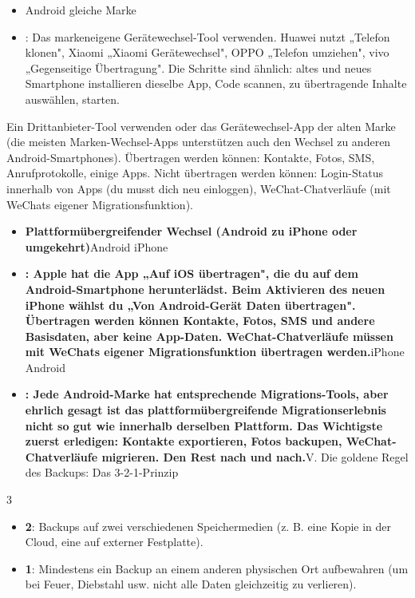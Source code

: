\begin{itemize}
  \item Android gleiche Marke
  \item : Das markeneigene Gerätewechsel-Tool verwenden. Huawei nutzt „Telefon klonen", Xiaomi „Xiaomi Gerätewechsel", OPPO „Telefon umziehen", vivo „Gegenseitige Übertragung". Die Schritte sind ähnlich: altes und neues Smartphone installieren dieselbe App, Code scannen, zu übertragende Inhalte auswählen, starten.
\end{itemize}


Ein Drittanbieter-Tool verwenden oder das Gerätewechsel-App der alten Marke (die meisten Marken-Wechsel-Apps unterstützen auch den Wechsel zu anderen Android-Smartphones). Übertragen werden können: Kontakte, Fotos, SMS, Anrufprotokolle, einige Apps. Nicht übertragen werden können: Login-Status innerhalb von Apps (du musst dich neu einloggen), WeChat-Chatverläufe (mit WeChats eigener Migrationsfunktion).

\begin{itemize}
  \item \textbf{Plattformübergreifender Wechsel (Android zu iPhone oder umgekehrt)}Android iPhone
  \item \textbf{: Apple hat die App „Auf iOS übertragen", die du auf dem Android-Smartphone herunterlädst. Beim Aktivieren des neuen iPhone wählst du „Von Android-Gerät Daten übertragen". Übertragen werden können Kontakte, Fotos, SMS und andere Basisdaten, aber keine App-Daten. WeChat-Chatverläufe müssen mit WeChats eigener Migrationsfunktion übertragen werden.}iPhone Android
  \item \textbf{: Jede Android-Marke hat entsprechende Migrations-Tools, aber ehrlich gesagt ist das plattformübergreifende Migrationserlebnis nicht so gut wie innerhalb derselben Plattform. Das Wichtigste zuerst erledigen: Kontakte exportieren, Fotos backupen, WeChat-Chatverläufe migrieren. Den Rest nach und nach.}V. Die goldene Regel des Backups: Das 3-2-1-Prinzip
\end{itemize}


3


\begin{itemize}
  \item \textbf{2}: Backups auf zwei verschiedenen Speichermedien (z. B. eine Kopie in der Cloud, eine auf externer Festplatte).
  \item \textbf{1}: Mindestens ein Backup an einem anderen physischen Ort aufbewahren (um bei Feuer, Diebstahl usw. nicht alle Daten gleichzeitig zu verlieren).
\end{itemize}

